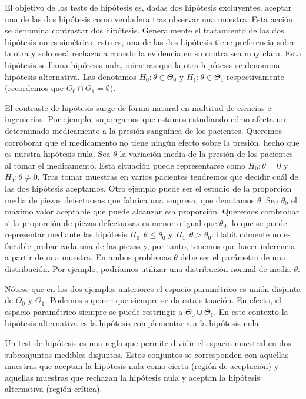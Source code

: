 \documentclass{article}
\begin{document}
El objetivo de los tests de hipótesis es, dadas dos hipótesis excluyentes, aceptar una de las dos hipótesis como verdadera tras observar una muestra. Esta acción se denomina contrastar dos hipótesis. Generalmente el tratamiento de las dos hipótesis no es simétrico, esto es, una de las dos hipótesis tiene preferencia sobre la otra y solo será rechazada cuando la evidencia en su contra sea muy clara. Esta hipótesis se llama hipótesis nula, mientras que la otra hipótesis se denomina hipótesis alternativa. Las denotamos $H_0: \theta \in \Theta_0$ y $H_1: \theta \in \Theta_1$ respectivamente (recordemos que $\Theta_0 \cap \Theta_1 = \emptyset$).

El contraste de hipótesis surge de forma natural en multitud de ciencias e ingenierías. Por ejemplo, supongamos que estamos estudiando cómo afecta un determinado medicamento a la presión sanguínea de los pacientes. Queremos corroborar que el medicamento no tiene ningún efecto sobre la presión, hecho que es nuestra hipótesis nula. Sea $\theta$ la variación media de la presión de los pacientes al tomar el medicamento. Esta situación puede representarse como $H_0: \theta = 0$ y $H_1: \theta \ne 0$. Tras tomar muestras en varios pacientes tendremos que decidir cuál de las dos hipótesis aceptamos. Otro ejemplo puede ser el estudio de la proporción media de piezas defectuosas que fabrica una empresa, que denotamos $\theta$. Sea $\theta_0$ el máximo valor aceptable que puede alcanzar esa proporción. Queremos combrobar si la proporción de piezas defectuosas es menor o igual que $\theta_0$, lo que se puede representar mediante las hipótesis $H_0: \theta \le \theta_0$ y $H_1: \theta > \theta_0$. Habitualmente no es factible probar cada una de las piezas y, por tanto, tenemos que hacer inferencia a partir de una muestra. En ambos problemas $\theta$ debe ser el parámetro de una distribución. Por ejemplo, podríamos utilizar una distribución normal de media $\theta$.

Nótese que en los dos ejemplos anteriores el espacio paramétrico es unión disjunta de $\Theta_0$ y $\Theta_1$. Podemos suponer que siempre se da esta situación. En efecto, el espacio paramétrico siempre se puede restringir a $\Theta_0 \cup \Theta_1$. En este contexto la hipótesis alternativa es la hipótesis complementaria a la hipótesis nula.

\begin{definition}
    Un test de hipótesis es una regla que permite dividir el espacio muestral en dos subconjuntos medibles disjuntos. Estos conjuntos se corresponden con aquellas muestras que aceptan la hipótesis nula como cierta (región de aceptación) y aquellas muestras que rechazan la hipótesis nula y aceptan la hipótesis alternativa (región crítica).
\end{definition}
\end{document}
